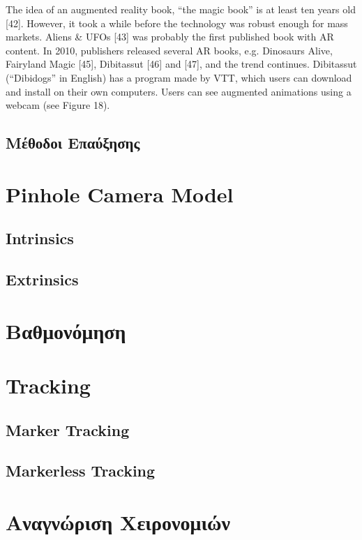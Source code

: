 The idea of an augmented reality book, “the magic book” is at least ten years old [42]. However, it took a while before the technology was robust enough for mass markets. Aliens \& UFOs [43] was probably the first published book with AR content. In 2010, publishers released several AR books, e.g. Dinosaurs Alive\! [44], Fairyland Magic [45], Dibitassut [46] and [47], and the trend continues. Dibitassut (“Dibidogs” in English) has a program made by VTT, which users can download and install on their own computers. Users can see augmented animations using a webcam (see Figure 18).

\subsection{Μέθοδοι Επαύξησης}



\section{Pinhole Camera Model}
\subsection{Intrinsics}
\subsection{Extrinsics}
\section{Βαθμονόμηση}

\section{Tracking}
\subsection{Marker Tracking}
    
\subsection{Markerless Tracking}





\section{Αναγνώριση Χειρονομιών}

